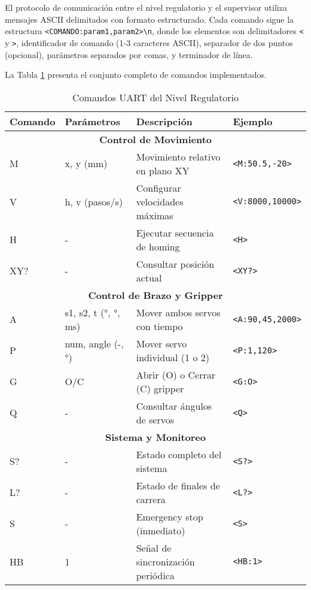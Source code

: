 El protocolo de comunicación entre el nivel regulatorio y el supervisor utiliza mensajes ASCII delimitados con formato estructurado. Cada comando sigue la estructura \texttt{<COMANDO:param1,param2>\textbackslash n}, donde los elementos son delimitadores \texttt{<} y \texttt{>}, identificador de comando (1-3 caracteres ASCII), separador de dos puntos (opcional), parámetros separados por comas, y terminador de línea.

La Tabla \ref{tab:comandos_uart} presenta el conjunto completo de comandos implementados.

\begin{table}[H]
\centering
\small
\begin{tabular}{|l|l|p{4.5cm}|l|}
\hline
\textbf{Comando} & \textbf{Parámetros} & \textbf{Descripción} & \textbf{Ejemplo} \\
\hline
\multicolumn{4}{|c|}{\textbf{Control de Movimiento}} \\
\hline
M & x, y (mm) & Movimiento relativo en plano XY & \texttt{<M:50.5,-20>} \\
\hline
V & h, v (pasos/s) & Configurar velocidades máximas & \texttt{<V:8000,10000>} \\
\hline
H & - & Ejecutar secuencia de homing & \texttt{<H>} \\
\hline
XY? & - & Consultar posición actual & \texttt{<XY?>} \\
\hline
\multicolumn{4}{|c|}{\textbf{Control de Brazo y Gripper}} \\
\hline
A & s1, s2, t (°, °, ms) & Mover ambos servos con tiempo & \texttt{<A:90,45,2000>} \\
\hline
P & num, angle (-, °) & Mover servo individual (1 o 2) & \texttt{<P:1,120>} \\
\hline
G & O/C & Abrir (O) o Cerrar (C) gripper & \texttt{<G:O>} \\
\hline
Q & - & Consultar ángulos de servos & \texttt{<Q>} \\
\hline
\multicolumn{4}{|c|}{\textbf{Sistema y Monitoreo}} \\
\hline
S? & - & Estado completo del sistema & \texttt{<S?>} \\
\hline
L? & - & Estado de finales de carrera & \texttt{<L?>} \\
\hline
S & - & Emergency stop (inmediato) & \texttt{<S>} \\
\hline
HB & 1 & Señal de sincronización periódica & \texttt{<HB:1>} \\
\hline
\end{tabular}
\caption{Comandos UART del Nivel Regulatorio}
\label{tab:comandos_uart}
\end{table}

